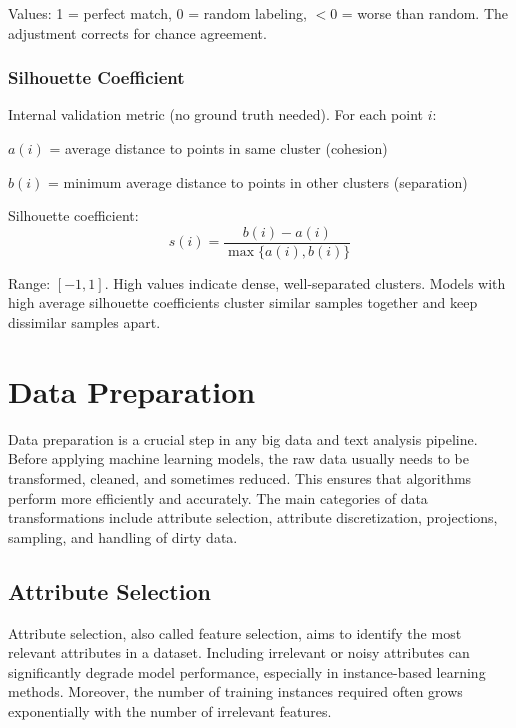    Values: 1 = perfect match, 0 = random labeling, $< 0$ = worse than random. The adjustment corrects for chance agreement.
    
    \subsubsection{Silhouette Coefficient}
    
    Internal validation metric (no ground truth needed). For each point $i$:
    \begin{compactitemize}
        \item $a(i)$ = average distance to points in same cluster (cohesion)
        \item $b(i)$ = minimum average distance to points in other clusters (separation)
    \end{compactitemize}
    
    Silhouette coefficient:
    \begin{equation}
    s(i) = \frac{b(i) - a(i)}{\max\{a(i), b(i)\}}
    \end{equation}
    
    Range: $[-1, 1]$. High values indicate dense, well-separated clusters. Models with high average silhouette coefficients cluster similar samples together and keep dissimilar samples apart.




    \section{Data Preparation}

    Data preparation is a crucial step in any big data and text analysis pipeline. Before applying machine learning models, the raw data usually needs to be transformed, cleaned, and sometimes reduced. This ensures that algorithms perform more efficiently and accurately. The main categories of data transformations include attribute selection, attribute discretization, projections, sampling, and handling of dirty data.
    
    \subsection{Attribute Selection}
    Attribute selection, also called feature selection, aims to identify the most relevant attributes in a dataset. Including irrelevant or noisy attributes can significantly degrade model performance, especially in instance-based learning methods. Moreover, the number of training instances required often grows exponentially with the number of irrelevant features.
    
